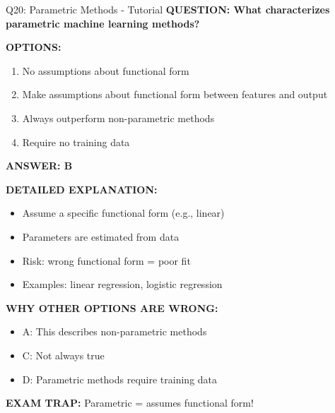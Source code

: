 \documentclass[8pt]{beamer}
\begin{document}
	\begin{frame}{Q20: Parametric Methods - Tutorial}
		\fontsize{6.5}{7.5}\selectfont
		\textbf{QUESTION: What characterizes parametric machine learning methods?}
		
		\vspace{0.1cm}
		\textbf{OPTIONS:}
		\begin{enumerate}
			\item No assumptions about functional form
			\item Make assumptions about functional form between features and output
			\item Always outperform non-parametric methods
			\item Require no training data
		\end{enumerate}
		
		\vspace{0.1cm}
		\textcolor{myblue}{\textbf{ANSWER: B}}
		
		\vspace{0.1cm}
		\textbf{DETAILED EXPLANATION:}
		\begin{itemize}
			\item Assume a specific functional form (e.g., linear)
			\item Parameters are estimated from data
			\item Risk: wrong functional form = poor fit
			\item Examples: linear regression, logistic regression
		\end{itemize}
		
		\vspace{0.1cm}
		\textcolor{myred}{\textbf{WHY OTHER OPTIONS ARE WRONG:}}
		\begin{itemize}
			\item \textcolor{myred}{A:} This describes non-parametric methods
			\item \textcolor{myred}{C:} Not always true
			\item \textcolor{myred}{D:} Parametric methods require training data
		\end{itemize}
		
		\textcolor{myred}{\textbf{EXAM TRAP:}} Parametric = \textcolor{myblue}{assumes functional form}!
	\end{frame}
	
\end{document}

